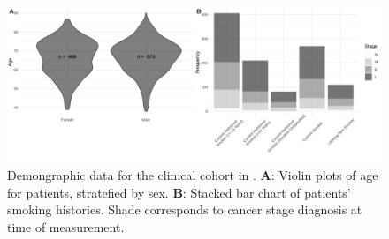 \documentclass[10pt,twoside,openright]{report}
\begin{document}
\begin{figure}[htbp]
\centering
\includegraphics[width=6in]{clinical_data_demographics.png}
\vspace*{-5mm}
\caption{Demongraphic data for the clinical cohort in \citet{campbell_distinct_2016}. \textbf{A}: Violin plots of age for patients, stratefied by sex. \textbf{B}: Stacked bar chart of patients' smoking histories. Shade corresponds to cancer stage diagnosis at time of measurement. \label{fig:clinicaldata}}
\vspace*{-2mm}
\end{figure}



\end{document}
